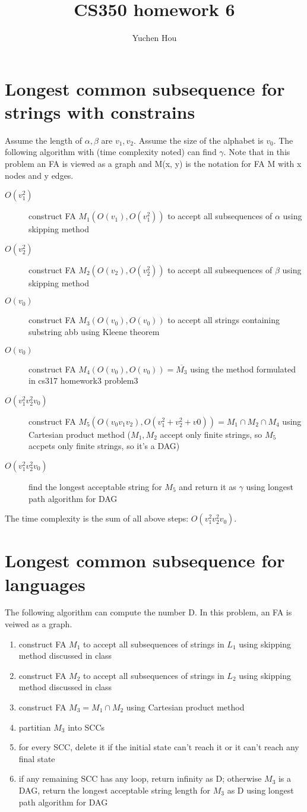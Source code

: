 \documentclass{article}
\begin{document}
\lstset{language=Java}
\title{CS350 homework 6}
\author{Yuchen Hou}
\maketitle
\section{Longest common subsequence for strings with constrains}
Assume the length of $\alpha, \beta$ are $v_1, v_2$. Assume the size of
the alphabet is $v_0$. The following algorithm with (time complexity noted) can
find $\gamma$. Note that in this problem an FA is viewed as a graph and M(x, y)
is the notation for FA M with x nodes and y edges.
\begin{description}
  \item[$O(v_1^2)$] construct FA $M_1(O(v_1), O(v_1^2))$ to accept all
  subsequences of $\alpha$ using skipping method
  \item[$O(v_2^2)$] construct FA $M_2(O(v_2), O(v_2^2))$ to accept all
  subsequences of $\beta$ using skipping method
  \item[$O(v_0)$] construct FA $M_3(O(v_0), O(v_0))$ to accept all strings
  containing substring abb using Kleene theorem
  \item[$O(v_0)$] construct FA $M_4(O(v_0), O(v_0)) = \overline{M_3}$ using
  the method formulated in cs317 homework3 problem3
  \item[$O(v_1^2v_2^2v_0)$] construct FA $M_5(O(v_0v_1v_2), O(v_1^2 + v_2^2 +
  v0)) = M_1 \cap M_2 \cap M_4$ using Cartesian product method ($M_1, M_2$
  accept only finite strings, so $M_5$ accpets only finite strings, so it's a
  DAG)
  \item[$O(v_1^2v_2^2v_0)$] find the longest acceptable string for $M_5$ and
  return it as $\gamma$ using longest path algorithm for DAG
\end{description}
The time complexity is the sum of all above steps: $O(v_1^2v_2^2v_0)$.
\section{Longest common subsequence for languages}
The following algorithm can compute the number D. In this problem, an FA is
veiwed as a graph.
\begin{enumerate}
  \item construct FA $M_1$ to accept all subsequences of strings in $L_1$ using
  skipping method discussed in class
  \item construct FA $M_2$ to accept all subsequences of strings in $L_2$ using
  skipping method discussed in class
  \item construct FA $M_3  = M_1 \cap M_2$ using Cartesian product method
  \item partitian $M_3$ into SCCs
  \item for every SCC, delete it if the initial state can't reach it or it can't
  reach any final state
  \item if any remaining SCC has any loop, return infinity as D; otherwise $M_3$
  is a DAG, return the longest acceptable string length for $M_3$ as D using
  longest path algorithm for DAG
\end{enumerate}
\end{document}
